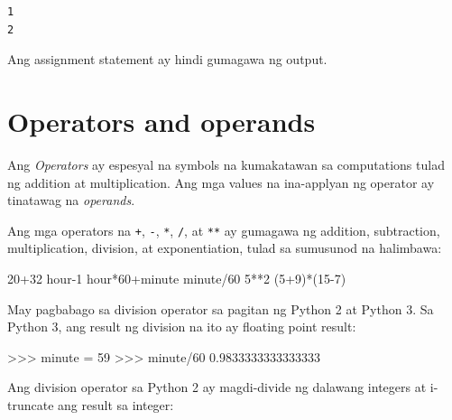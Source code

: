 \documentclass[10pt,]{book}
\newenvironment{Shaded}{}{}
\newcommand{\DecValTok}[1]{\textcolor[rgb]{0.25,0.63,0.44}{#1}}
\newcommand{\FloatTok}[1]{\textcolor[rgb]{0.25,0.63,0.44}{#1}}
\newcommand{\NormalTok}[1]{#1}
\newcommand{\OperatorTok}[1]{\textcolor[rgb]{0.40,0.40,0.40}{#1}}
\begin{document}
{\small
\begin{verbatim}
1
2
\end{verbatim}
}

Ang assignment statement ay hindi gumagawa ng output.

\section{Operators and operands}\label{operators-and-operands}

  

Ang \emph{Operators} ay espesyal na symbols na kumakatawan sa
computations tulad ng addition at multiplication. Ang mga values na
ina-applyan ng operator ay tinatawag na \emph{operands}.

Ang mga operators na \texttt{+}, \texttt{-}, \texttt{*}, \texttt{/}, at
\texttt{**} ay gumagawa ng addition, subtraction, multiplication,
division, at exponentiation, tulad sa sumusunod na halimbawa:

\begin{Shaded}
\begin{Highlighting}[]
\DecValTok{20}\OperatorTok{+}\DecValTok{32}
\NormalTok{hour}\OperatorTok{{-}}\DecValTok{1}
\NormalTok{hour}\OperatorTok{*}\DecValTok{60}\OperatorTok{+}\NormalTok{minute}
\NormalTok{minute}\OperatorTok{/}\DecValTok{60}
\DecValTok{5}\OperatorTok{**}\DecValTok{2}
\NormalTok{(}\DecValTok{5}\OperatorTok{+}\DecValTok{9}\NormalTok{)}\OperatorTok{*}\NormalTok{(}\DecValTok{15}\OperatorTok{{-}}\DecValTok{7}\NormalTok{)}
\end{Highlighting}
\end{Shaded}

May pagbabago sa division operator sa pagitan ng Python 2 at Python 3.
Sa Python 3, ang result ng division na ito ay floating point result:

\begin{Shaded}
\begin{Highlighting}[]
\OperatorTok{\textgreater{}\textgreater{}\textgreater{}}\NormalTok{ minute }\OperatorTok{=} \DecValTok{59}
\OperatorTok{\textgreater{}\textgreater{}\textgreater{}}\NormalTok{ minute}\OperatorTok{/}\DecValTok{60}
\FloatTok{0.9833333333333333}
\end{Highlighting}
\end{Shaded}

Ang division operator sa Python 2 ay magdi-divide ng dalawang integers
at i-truncate ang result sa integer:
\end{document}
